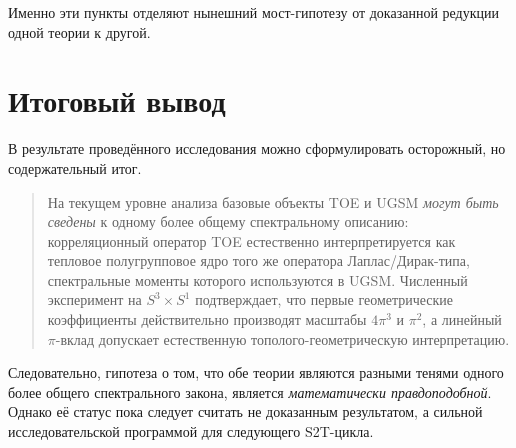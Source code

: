 \documentclass[12pt,a4paper]{article}
\begin{document}
Именно эти пункты отделяют нынешний мост-гипотезу от доказанной редукции одной теории к другой.

\section{Итоговый вывод}

В результате проведённого исследования можно сформулировать осторожный, но содержательный итог.

\begin{quote}
На текущем уровне анализа базовые объекты TOE и UGSM \emph{могут быть сведены} к одному более общему спектральному описанию: корреляционный оператор TOE естественно интерпретируется как тепловое полугрупповое ядро того же оператора Лаплас/Дирак-типа, спектральные моменты которого используются в UGSM. Численный эксперимент на \(S^3 \times S^1\) подтверждает, что первые геометрические коэффициенты действительно производят масштабы \(4\pi^3\) и \(\pi^2\), а линейный \(\pi\)-вклад допускает естественную тополого-геометрическую интерпретацию.
\end{quote}

Следовательно, гипотеза о том, что обе теории являются разными тенями одного более общего спектрального закона, является \emph{математически правдоподобной}. Однако её статус пока следует считать не доказанным результатом, а сильной исследовательской программой для следующего S2T-цикла.
\end{document}
